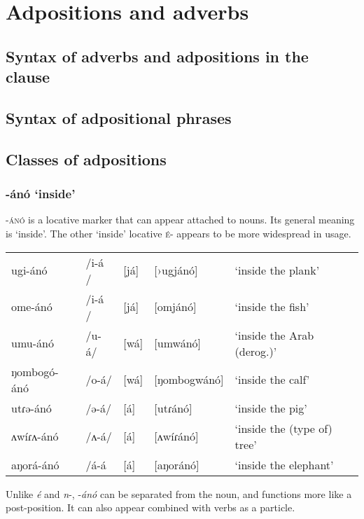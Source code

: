 \chapter{Adpositions and adverbs}\label{chapter:adverbs}


\section{Syntax of adverbs and adpositions in the clause}


\section{Syntax of adpositional phrases}

\section{Classes of adpositions}\label{sec:ch13:adpositions}


\subsection{-ánó `inside'}  %

-\textsc{ánó} is a locative marker that can appear attached to nouns. Its general meaning is ‘inside’. The other ‘inside’ locative \textsc{é}- appears to be more widespread in usage. 

\begin{tabular}[t]{lllll}
ugi-ánó 	&	/i-á /&	[já]	&	[›ugjánó] &	‘inside the plank’\\
ome-ánó 	&	/i-á /&	[já]	&	[omjánó]  &	‘inside the fish’\\
umu-ánó 	&	/u-á/ &	[wá]	&	[umwánó]  &	‘inside the Arab (derog.)’\\
ŋombogó-ánó &	/o-á/ &	[wá]	&	[ŋombogwánó]& ‘inside the calf’\\
utɾə-ánó 	&	/ə-á/ &	[á] 	&	[utɾánó]  &	‘inside the pig’\\
ʌwíɾʌ-ánó 	&	/ʌ-á/ &	[á] 	&	[ʌwíɾánó] &	‘inside the (type of) tree’\\
aŋorá-ánó 	&	/á-á  &	[á] 	&	[aŋoránó] &	‘inside the elephant’\\
\end{tabular}

Unlike \textit{é} and \textit{n}-, -\textit{ánó} can be separated from the noun, and functions more like a post-position. It can also appear combined with verbs as a particle. 

